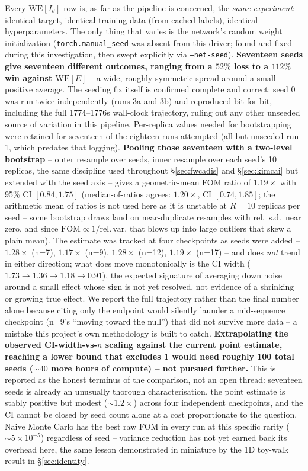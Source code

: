 \documentclass[a4paper,fleqn]{cas-sc}
\begin{document}
Every $\mathrm{WE}[I_\theta]$ row is, as far as the pipeline is concerned, the
\emph{same experiment}: identical target, identical training data (from cached labels),
identical hyperparameters. The only thing that varies is the network's random weight
initialization (\texttt{torch.manual\_seed} was absent from this driver; found and
fixed during this investigation, then swept explicitly via \texttt{--net-seed}).
\textbf{Seventeen seeds give seventeen different outcomes, ranging from a $52\%$ loss to
	a $112\%$ win against $\mathrm{WE}[E]$} -- a wide, roughly symmetric spread around a
small positive average. The seeding fix itself is confirmed complete and correct: seed
0 was run twice independently (runs 3a and 3b) and reproduced bit-for-bit, including the
full 1774--1776s wall-clock trajectory, ruling out any other unseeded source of
variation in this pipeline. Per-replica values needed for bootstrapping were retained
for seventeen of the eighteen runs attempted (all but unseeded run 1, which predates that
logging).
\textbf{Pooling those seventeen with a two-level bootstrap} -- outer resample over seeds,
inner resample over each seed's 10 replicas, the same discipline used throughout
\S\ref{sec:fwcadis} and \S\ref{sec:kimcai} but extended with the seed axis -- gives a
geometric-mean FOM ratio of $1.19\times$ with 95\% CI $[0.84, 1.75]$ (median-of-ratios
agrees: $1.20\times$, CI $[0.74, 1.85]$; the arithmetic mean of ratios is not used here
as it is unstable at $R=10$ replicas per seed -- some bootstrap draws land on
near-duplicate resamples with rel.\ s.d.\ near zero, and since $\mathrm{FOM}\propto
1/\mathrm{rel.\,var.}$ that blows up into large outliers that skew a plain mean).
The estimate was tracked at four checkpoints as seeds were added -- $1.28\times$
(n=7), $1.17\times$ (n=9), $1.28\times$ (n=12), $1.19\times$ (n=17) -- and does
\emph{not} trend in either direction; what does move monotonically is the CI width
($1.73\to1.36\to1.18\to0.91$), the expected signature of averaging down noise around a
small effect whose sign is not yet resolved, not evidence of a shrinking or growing true
effect. We report the full trajectory rather than the final number alone because citing
only the endpoint would silently launder a mid-sequence checkpoint (n=9's ``moving
toward the null'') that did not survive more data -- a mistake this project's own
methodology is built to catch.
\textbf{Extrapolating the observed CI-width-vs-$n$ scaling against the current point
	estimate, reaching a lower bound that excludes 1 would need roughly 100 total seeds
	($\sim\!40$ more hours of compute) -- not pursued further.} This is reported as the
honest terminus of the comparison, not an open
thread: seventeen seeds is already an unusually thorough characterisation, the point
estimate is stably positive but modest ($\sim\!1.2\times$) across four independent
checkpoints, and the CI cannot be closed by seed count alone at a cost proportionate to
the question. Naive Monte Carlo has the best raw FOM in every run
at this specific rarity ($\sim\!5\times10^{-5}$) regardless of seed -- variance
reduction has not yet earned back its overhead here, the same lesson demonstrated in
miniature by the 1D toy-walk result in \S\ref{sec:identity}.
\end{document}
